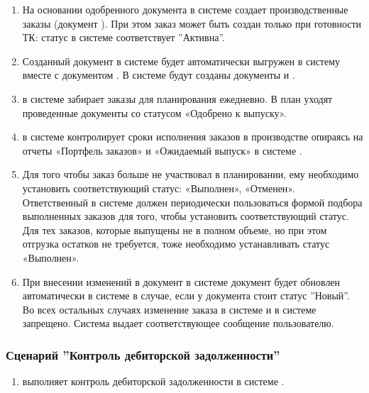 \begin{enumerate}
\item	На основании одобренного документа  в системе \gofro \manager создает производственные заказы (документ ).
При этом заказ может быть создан только при готовности ТК: статус  в системе \gofro соответствует ''Активна''.

\item Созданный документ  в системе \gofro будет автоматически выгружен в систему \erp вместе с документом . В системе  \erp будут созданы документы  и .  

\item	\planner в системе \gofro забирает заказы для планирования ежедневно. В план уходят проведенные документы  со статусом «Одобрено к выпуску».
\item	\manager в системе \gofro контролирует сроки исполнения заказов в производстве опираясь на отчеты «Портфель заказов» и «Ожидаемый выпуск» в системе \gofro.
\item	Для того чтобы заказ больше не участвовал в планировании, ему необходимо установить соответствующий статус: «Выполнен», «Отменен». Ответственный \manager в системе \gofro должен периодически пользоваться формой подбора выполненных заказов для того, чтобы установить соответствующий статус. Для тех заказов, которые выпущены не в полном объеме, но при этом отгрузка остатков не требуется, тоже необходимо устанавливать статус «Выполнен».
\item При внесении изменений в документ  в системе \erp документ будет обновлен автоматически в системе \gofro в случае, если у документа стоит статус ''Новый''. Во всех остальных случаях изменение заказа в системе \gofro и в системе \erp запрещено. Система \erp  выдает соответствующее сообщение пользователю.
\end{enumerate}


\subsubsection{Сценарий ''Контроль дебиторской задолженности''}
\label{bp:sales_6}


\begin{enumerate}
\item	\manager выполняет контроль дебиторской задолженности в системе \erp.
\end{enumerate}

